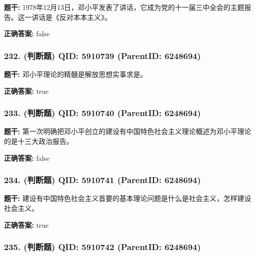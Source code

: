 \documentclass[12pt,UTF8]{ctexart}
\begin{document}
\textbf{题干:}
1978年12月13日，邓小平发表了讲话，它成为党的十一届三中全会的主题报告。这一讲话是《反对本本主义》。



\textbf{正确答案:}
false

\vspace{0.3em}\hrulefill\vspace{0.7em}

\subsubsection*{232. (判断题) \small QID: 5910739 (ParentID: 6248694)}

\textbf{题干:}
邓小平理论的精髓是解放思想实事求是。



\textbf{正确答案:}
true

\vspace{0.3em}\hrulefill\vspace{0.7em}

\subsubsection*{233. (判断题) \small QID: 5910740 (ParentID: 6248694)}

\textbf{题干:}
第一次明确把邓小平创立的建设有中国特色社会主义理论概述为邓小平理论的是十三大政治报告。



\textbf{正确答案:}
false

\vspace{0.3em}\hrulefill\vspace{0.7em}

\subsubsection*{234. (判断题) \small QID: 5910741 (ParentID: 6248694)}

\textbf{题干:}
建设有中国特色社会主义首要的基本理论问题是什么是社会主义，怎样建设社会主义。



\textbf{正确答案:}
true

\vspace{0.3em}\hrulefill\vspace{0.7em}

\subsubsection*{235. (判断题) \small QID: 5910742 (ParentID: 6248694)}
\end{document}
